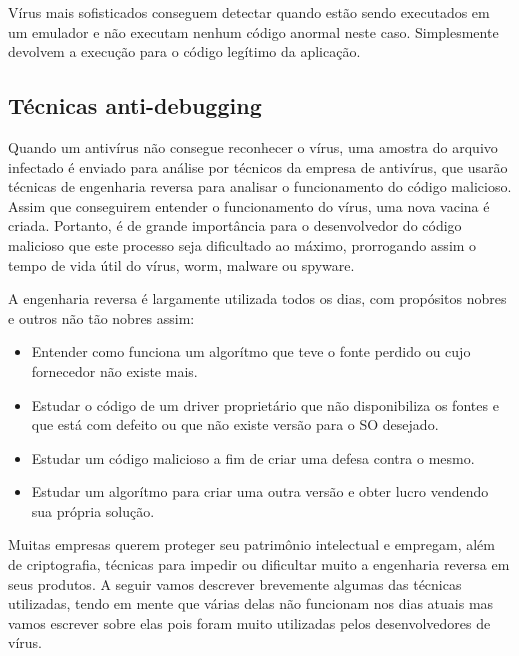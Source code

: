 Vírus mais sofisticados conseguem detectar quando estão sendo executados em um emulador e não executam nenhum código anormal neste caso. Simplesmente devolvem a execução para o código legítimo da aplicação.

\subsection{Técnicas anti-debugging} 
Quando um antivírus não consegue reconhecer o vírus, uma amostra do arquivo infectado é enviado para análise por técnicos da empresa de antivírus, que usarão técnicas de engenharia reversa para analisar o funcionamento do código malicioso. Assim que conseguirem entender o funcionamento do vírus, uma nova vacina é criada. Portanto, é de grande importância para o desenvolvedor do código malicioso que este processo seja dificultado ao máximo, prorrogando assim o tempo de vida útil do vírus, worm, malware ou spyware. 

A engenharia reversa é largamente utilizada todos os dias, com propósitos nobres e outros não tão nobres assim:
\begin{itemize}
 \item Entender como funciona um algorítmo que teve o fonte perdido ou cujo fornecedor não existe mais.
 \item Estudar o código de um driver proprietário que não disponibiliza os fontes e que está com defeito ou que não existe versão para o SO desejado. 
 \item Estudar um código malicioso a fim de criar uma defesa contra o mesmo.
 \item Estudar um algorítmo para criar uma outra versão e obter lucro vendendo sua própria solução.
\end{itemize}

Muitas empresas querem proteger seu patrimônio intelectual e empregam, além de criptografia, técnicas para impedir ou dificultar muito a engenharia reversa em seus produtos. A seguir vamos descrever brevemente algumas das técnicas utilizadas, tendo em mente que várias delas não funcionam nos dias atuais mas vamos escrever sobre elas pois foram muito utilizadas pelos desenvolvedores de vírus. 

